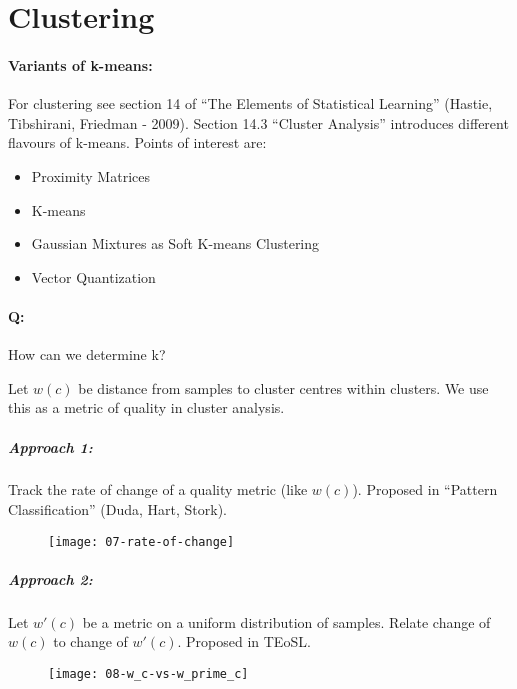 
\section{Clustering}

\paragraph{Variants of k-means:}
For clustering see section 14 of ``The Elements of Statistical Learning'' (Hastie, Tibshirani, Friedman - 2009). Section 14.3 ``Cluster Analysis'' introduces different flavours of k-means. Points of interest are:
\begin{itemize}
	\item Proximity Matrices
	\item K-means
	\item Gaussian Mixtures as Soft K-means Clustering
	\item Vector Quantization
\end{itemize}

\paragraph{Q:} How can we determine k?

Let $w(c)$ be distance from samples to cluster centres within clusters. We use this as a metric of quality in cluster analysis.

\subparagraph{Approach 1:} Track the rate of change of a quality metric (like $w(c)$). Proposed in ``Pattern Classification'' (Duda, Hart, Stork).

\begin{figure}[H]
	\centering
	\texttt{[image: 07-rate-of-change]}
\end{figure}

\subparagraph{Approach 2:} Let $w'(c)$ be a metric on a uniform distribution of samples. Relate change of $w(c)$ to change of $w'(c)$. Proposed in TEoSL.

\begin{figure}[H]
	\centering
	\texttt{[image: 08-w\_c-vs-w\_prime\_c]}
\end{figure}